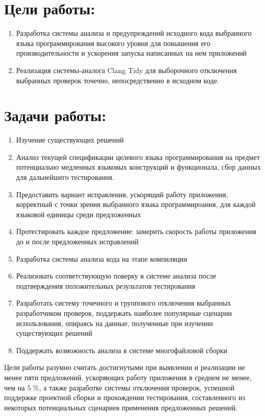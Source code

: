 \documentclass{mipt-thesis-bs}
\begin{document}
\section{Цели работы:}

\begin{enumerate}
    \item Разработка системы анализа и предупреждений исходного кода выбранного языка программирования высокого уровня 
для повышения его производительности и ускорения запуска написанных на нем приложений
    \item Реализация системы-аналога Clang Tidy для выборочного отключения выбранных проверок точечно, непосредственно в исходном коде.
\end{enumerate}

\section{Задачи работы:}

\begin{enumerate}
    \item Изучение существующих решений
    \item Анализ текущей спецификации целевого языка программирования на предмет потенциально медленных языковых конструкций и функционала, 
    сбор данных для дальнейшего тестирования.
    \item Предоставить вариант исправления, ускорящий работу приложения, корректный с точки 
    зрения выбранного языка программироания, для каждой языковой единицы среди предложенных
    \item Протестировать каждое предложение: замерить скорость работы приложения до и после предложенных исправлений
    \item Разработка системы анализа кода на этапе компиляции
    \item Реализовать соответствующую поверку в системе анализа после подтверждения положительных результатов тестирования
    \item Разработать систему точечного и группового отключения выбранных разработчиком проверок, поддержать наиболее популярные сценарии 
    использования, опираясь на данные, полученные при изучении существующих решений
    \item Поддержать возможность анализа в системе многофайловой сборки

\end{enumerate}

Цели работы разумно считать достигнутыми при выявлении и реализации не менее пяти предложений, ускоряющих работу приложения в среднем не менее, чем на 5 \%, 
а также разработке системы отключения проверок, успешной поддержке проектной сборки и прохождении тестирования, составленного из некоторых 
потенциальных сценариев применения предложенных решений.
\end{document}
